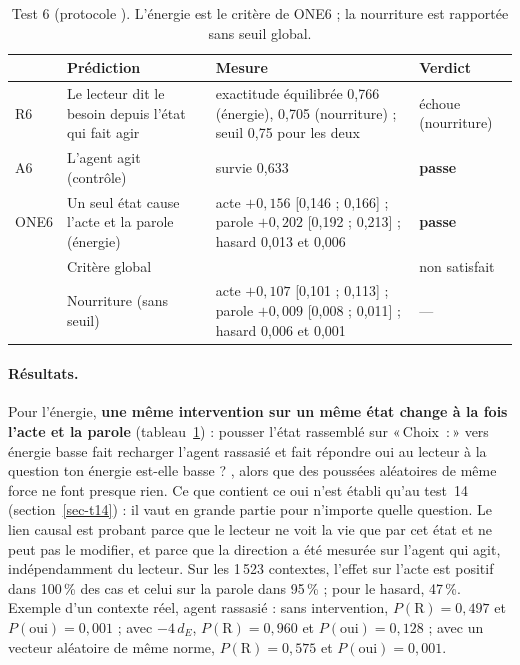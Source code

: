 \documentclass[11pt,a4paper]{article}
\newcommand{\passe}{\textbf{passe}}
\newcommand{\Choix}{«\,Choix~:\,»}
\newcommand{\dE}{d_{E}}
\newcommand{\code}[1]{\texttt{\detokenize{#1}}}
\begin{document}
\begin{table}[t]
\centering
\caption{Test 6 (protocole \code{3b27636}). L'énergie est le critère de ONE6 ; la
nourriture est rapportée sans seuil global.}
\label{tab-t6}
\small
\begin{tabularx}{\textwidth}{@{}l >{\raggedright\arraybackslash}p{3.6cm} X l@{}}
\toprule
& Prédiction & Mesure & Verdict \\
\midrule
R6 & Le lecteur dit le besoin depuis l'état qui fait agir & exactitude équilibrée 0,766 (énergie), 0,705 (nourriture) ; seuil 0,75 pour les deux & échoue (nourriture) \\
A6 & L'agent agit (contrôle) & survie 0,633 & \passe \\
ONE6 & Un seul état cause l'acte et la parole (énergie) & acte $+0,156$ [0,146 ; 0,166] ; parole $+0,202$ [0,192 ; 0,213] ; hasard 0,013 et 0,006 & \passe \\
\midrule
& Critère global & & non satisfait \\
\midrule
& Nourriture (sans seuil) & acte $+0,107$ [0,101 ; 0,113] ; parole $+0,009$ [0,008 ; 0,011] ; hasard 0,006 et 0,001 & --- \\
\bottomrule
\end{tabularx}
\end{table}

\paragraph{Résultats.} Pour l'énergie, \textbf{une même intervention sur un même
état change à la fois l'acte et la parole} (tableau~\ref{tab-t6}) : pousser l'état
rassemblé sur \Choix{} vers \og énergie basse \fg{} fait recharger l'agent rassasié
et fait répondre \og oui \fg{} au lecteur à la question \og ton énergie est-elle
basse ? \fg{}, alors que des poussées aléatoires de même force ne font presque rien.
Ce que contient ce \og oui \fg{} n'est établi qu'au test~14 (section~\ref{sec-t14}) :
il vaut en grande partie pour n'importe quelle question. Le lien causal est probant parce que le
lecteur ne voit la vie que par cet état et ne peut pas le modifier, et parce que la
direction a été mesurée sur l'agent qui agit, indépendamment du lecteur. Sur les
1\,523 contextes, l'effet sur l'acte est positif dans 100\,\% des cas et celui sur
la parole dans 95\,\% ; pour le hasard, 47\,\%. Exemple d'un contexte réel, agent
rassasié : sans intervention, $P(\mathrm R)=0,497$ et $P(\text{oui})=0,001$ ; avec
$-4\,\dE$, $P(\mathrm R)=0,960$ et $P(\text{oui})=0,128$ ; avec un vecteur aléatoire
de même norme, $P(\mathrm R)=0,575$ et $P(\text{oui})=0,001$.
\end{document}
